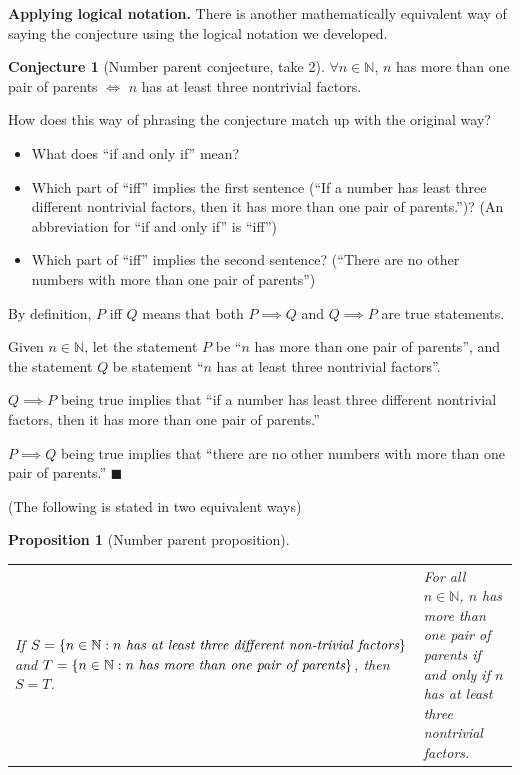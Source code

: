 \documentclass[11pt]{article}
\newenvironment{task}
	{\begin{mdframed}[linecolor=lightgray, linewidth=3pt]\raggedright}
	{\end{mdframed}}
\newcommand\tn{\textnormal}
\newcommand{\N}{\mathbb{N}}
\newcommand\st{:}
\newtheorem{proposition}[theorem]{Proposition}
\theoremstyle{definition}
\newtheorem{conjecture}[theorem]{Conjecture}
\newenvironment{solution}{{\it Solution.} }{\hfill {\color{lightgray}$\blacksquare$}}
\begin{document}
\bigskip
{\bf Applying logical notation.} There is another mathematically equivalent way of saying the conjecture using the logical notation we developed. 

\begin{conjecture}[Number parent conjecture, take 2]
$\forall n\in \N$, $n$ has more than one pair of parents $\iff$ $n$ has at least three nontrivial factors.
\end{conjecture}

\begin{task}
How does this way of phrasing the conjecture match up with the original way? 
	\begin{itemize}
	\item What does ``if and only if'' mean? 
	\item Which part of ``iff'' implies the first sentence (``If a number has least three different nontrivial factors, then it has more than one pair of parents.'')?   (An abbreviation for ``if and only if'' is ``iff'')
	\item Which part of ``iff'' implies the second sentence? (``There are no other numbers with more than one pair of parents'') 
	\end{itemize}
\end{task}


\begin{solution}
By definition, $P$ iff $Q$ means that both $P\implies Q$ and $Q\implies P$ are true statements.

Given $n\in \N$, let the statement $P$ be ``$n$ has more than one pair of parents'', and the statement $Q$ be statement ``$n$ has at least three nontrivial factors''.

$Q\implies P$ being true implies that ``if a number has least three different nontrivial factors, then it has more than one pair of parents.'' 

$P\implies Q$ being true implies that ``there are no other numbers with more than one pair of parents.'' 
\end{solution}

\bigskip


(The following is stated in two equivalent ways) 
\begin{proposition}[Number parent proposition]
\hspace*{-6pt}\begin{tabular}{L{3.5in}|L{2.8in}}
If $S=\{ n\in \N\st n\tn{ \it has at least three different non-trivial factors}\}$ and $T=\{ n\in \N \st n \tn{ \it has more than one pair of parents}\}$, then $S=T$.
& 
For all $n\in \N$, $n$ has more than one pair of parents if and only if $n$ has at least three nontrivial factors.
\end{tabular}
\end{proposition}
\end{document}
